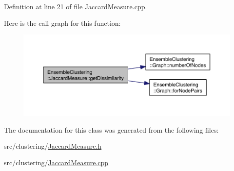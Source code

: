 Definition at line 21 of file Jaccard\-Measure.\-cpp.



Here is the call graph for this function\-:
\nopagebreak
\begin{figure}[H]
\begin{center}
\leavevmode
\includegraphics[width=350pt]{class_ensemble_clustering_1_1_jaccard_measure_afaac6df875532281f1091634bd861940_cgraph}
\end{center}
\end{figure}




The documentation for this class was generated from the following files\-:\begin{DoxyCompactItemize}
\item 
src/clustering/\hyperlink{_jaccard_measure_8h}{Jaccard\-Measure.\-h}\item 
src/clustering/\hyperlink{_jaccard_measure_8cpp}{Jaccard\-Measure.\-cpp}\end{DoxyCompactItemize}
